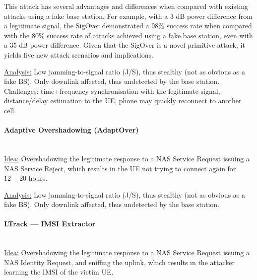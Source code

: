 This attack has several advantages and differences when compared with existing
attacks using a fake base station. For example, with a 3 dB power difference
from a legitimate signal, the SigOver demonstrated a 98\% success rate when
compared with the 80\% success rate of attacks achieved using a fake base
station, even with a 35 dB power difference. Given that the SigOver is a novel
primitive attack, it yields five new attack scenarios and implications.

\underline{Analysis:}
Low jamming-to-signal ratio (J/S), thus stealthy (not as obvious as a fake BS).
Only downlink affected, thus undetected by the base station.
Challenges: time+frequency synchronisation with the legitimate signal, distance/delay estimation to the UE, phone may quickly reconnect to another cell.


\paragraph{Adaptive Overshadowing (AdaptOver)} \mbox{} \\
\underline{Idea:}
Overshadowing the legitimate response to a NAS Service Request issuing a NAS Service Reject, which results in the UE not trying to connect again for $12-20$ hours.

\underline{Analysis:}
Low jamming-to-signal ratio (J/S), thus stealthy (not as obvious as a fake BS).
Only downlink affected, thus undetected by the base station.

\paragraph{LTrack --- IMSI Extractor} \mbox{} \\
\underline{Idea:}
Overshadowing the legitimate response to a NAS Service Request issuing a NAS Identity Request, and sniffing the uplink, which results in the attacker learning the IMSI of the victim UE.

